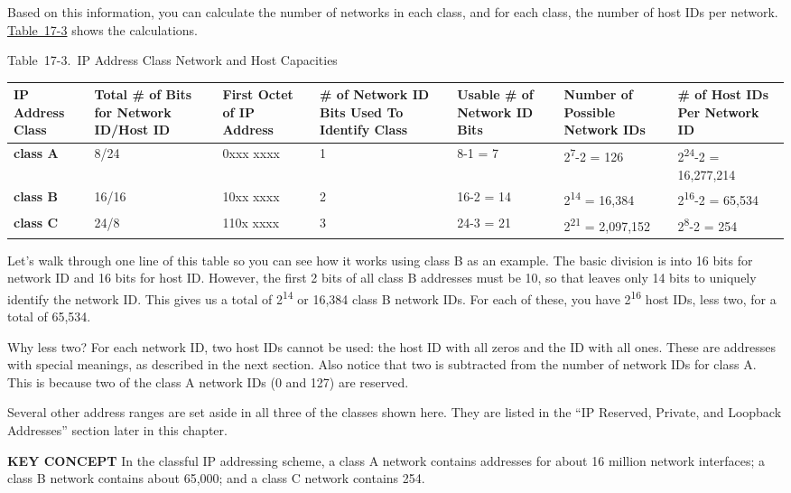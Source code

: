 Based on this information, you can calculate the number of networks in
each class, and for each class, the number of host IDs per network.
\protect\hyperlink{ch17s03.htmlux5cux23ip_address_class_network_and_host_capaci}{Table~17-3}
shows the calculations.

\protect\hypertarget{ch17s03.htmlux5cux23ip_address_class_network_and_host_capaci}{}{}

Table~17-3.~IP Address Class Network and Host Capacities

\begin{longtable}[]{@{}lllllll@{}}
\toprule
IP Address Class & Total \# of Bits for Network ID/Host ID & First Octet
of IP Address & \# of Network ID Bits Used To Identify Class & Usable \#
of Network ID Bits & Number of Possible Network IDs & \# of Host IDs Per
Network ID\tabularnewline
\midrule
\endhead
{\textbf{class A}} & 8/24 & 0xxx xxxx & 1 & 8-1 = 7 &
2\textsuperscript{7}-2 = 126 & 2\textsuperscript{24}-2 =
16,277,214\tabularnewline
{\textbf{class B}} & 16/16 & 10xx xxxx & 2 & 16-2 = 14 &
2\textsuperscript{14} = 16,384 & 2\textsuperscript{16}-2 =
65,534\tabularnewline
{\textbf{class C}} & 24/8 & 110x xxxx & 3 & 24-3 = 21 &
2\textsuperscript{21} = 2,097,152 & 2\textsuperscript{8}-2 =
254\tabularnewline
\bottomrule
\end{longtable}

Let's walk through one line of this table so you can see how it works
using class B as an example. The basic division is into 16 bits for
network ID and 16 bits for host ID. However, the first 2 bits of all
class B addresses must be 10, so that leaves only 14 bits to uniquely
identify the network ID. This gives us a total of 2\textsuperscript{14}
or 16,384 class B network IDs. For each of these, you have
2\textsuperscript{16} host IDs, less two, for a total of
65,534.\protect\hypertarget{ch17s03.htmlux5cux23idx-CHP-17-0694}{}{}

Why less two? For each network ID, two host IDs cannot be used: the host
ID with all zeros and the ID with all ones. These are addresses with
special meanings, as described in the next section. Also notice that two
is subtracted from the number of network IDs for class A. This is
because two of the class A network IDs (0 and 127) are reserved.

Several other address ranges are set aside in all three of the classes
shown here. They are listed in the ``IP Reserved, Private, and Loopback
Addresses'' section later in this chapter.


{\textbf{KEY CONCEPT}} In the classful IP addressing scheme, a class A
network contains addresses for about 16 million network interfaces; a
class B network contains about 65,000; and a class C network contains
254.


